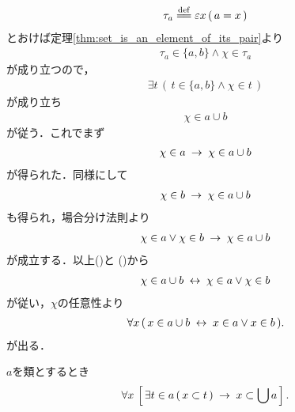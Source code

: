 \begin{sketch}
		\begin{align}
			\tau_a \defeq \varepsilon x\, (\, a = x\, )
		\end{align}
		とおけば定理\ref{thm:set_is_an_element_of_its_pair}より
		\begin{align}
			\tau_a \in \{a,b\} \wedge \chi \in \tau_a
		\end{align}
		が成り立つので，
		\begin{align}
			\exists t\, \left(\, t \in \{a,b\} \wedge \chi \in t\, \right)
		\end{align}
		が成り立ち
		\begin{align}
			\chi \in a \cup b
		\end{align}
		が従う．これでまず
		\begin{align}
			\chi \in a \hspace{0.25em}\rightarrow\hspace{0.25em} \chi \in a \cup b
		\end{align}
		が得られた．同様にして
		\begin{align}
			\chi \in b \hspace{0.25em}\rightarrow\hspace{0.25em} \chi \in a \cup b
		\end{align}
		も得られ，場合分け法則より
		\begin{align}
			\chi \in a \vee \chi \in b \hspace{0.25em}\rightarrow\hspace{0.25em} \chi \in a \cup b
			\label{fom:thm_union_of_pair_is_union_of_their_elements_3}
		\end{align}
		が成立する．以上()と
		()から
		\begin{align}
			\chi \in a \cup b \hspace{0.25em}\leftrightarrow\hspace{0.25em} \chi \in a \vee \chi \in b
		\end{align}
		が従い，$\chi$の任意性より
		\begin{align}
			\forall x\, (\, x \in a \cup b \hspace{0.25em}\leftrightarrow\hspace{0.25em} x \in a \vee x \in b\, ).
		\end{align}
		が出る．
		\QED
	\end{sketch}
	
	\begin{screen}
		\begin{thm}[要素の部分集合は合併の部分集合]
		\label{thm:union_is_bigger_than_any_member}
			$a$を類とするとき
			\begin{align}
				\forall x\, \left[\, \exists t \in a\, (\, x \subset t\, ) \hspace{0.25em}\rightarrow\hspace{0.25em} x \subset \bigcup a\, \right].
			\end{align}
		\end{thm}
	\end{screen}
	
